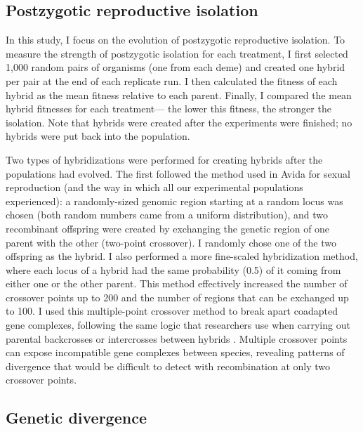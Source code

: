 \begin{doublespace}
\subsection{Postzygotic reproductive isolation}

In this study,
I focus on the evolution of postzygotic reproductive isolation.
%
To measure the strength of postzygotic isolation for each treatment,
I first selected 1,000 random pairs of organisms (one from each deme)
and created one hybrid per pair at the end of each replicate run.
%
I then calculated the fitness of each hybrid
as the mean fitness relative to each parent.
%
Finally, I compared the mean hybrid fitnesses for each treatment---%
the lower this fitness, the stronger the isolation.
%
Note that hybrids were created
after the experiments were finished;
no hybrids were put back into the population.



Two types of hybridizations were performed for creating hybrids
after the populations had evolved.
%
The first followed the method used in Avida for sexual reproduction
(and the way in which all our experimental populations experienced):
a randomly-sized genomic region starting at a random locus was chosen
(both random numbers came from a uniform distribution),
and two recombinant offspring were created by exchanging
the genetic region of one parent with the other (two-point crossover).
%
I randomly chose one of the two offspring as the hybrid.
%
I also performed a more fine-scaled hybridization method,
where each locus of a hybrid had the same probability (0.5)
of it coming from either one or the other parent.
%
This method effectively increased the number of crossover points up to 200
and the number of regions that can be exchanged up to 100.
%
I used this multiple-point crossover method
to break apart coadapted gene complexes,
following the same logic that researchers
use when carrying out parental backcrosses
or intercrosses between hybrids \citep[e.g.,][]{li97,bur99}.
%
Multiple crossover points can expose
incompatible gene complexes between species,
revealing patterns of divergence
that would be difficult to detect with
recombination at only two crossover points.



\subsection{Genetic divergence}




\end{doublespace}
